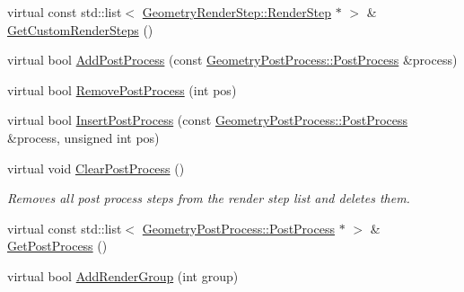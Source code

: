 \begin{DoxyCompactItemize}
virtual const std\+::list$<$ \mbox{\hyperlink{class_geometry_engine_1_1_geometry_render_step_1_1_render_step}{Geometry\+Render\+Step\+::\+Render\+Step}} $\ast$ $>$ \& \mbox{\hyperlink{class_geometry_engine_1_1_geometry_world_item_1_1_geometry_camera_1_1_camera_a55464c946d6e07ea8f00f5236593ee5f}{Get\+Custom\+Render\+Steps}} ()
\item 
virtual bool \mbox{\hyperlink{class_geometry_engine_1_1_geometry_world_item_1_1_geometry_camera_1_1_camera_aefeabe0fe7650e0b6236b59134058845}{Add\+Post\+Process}} (const \mbox{\hyperlink{class_geometry_engine_1_1_geometry_post_process_1_1_post_process}{Geometry\+Post\+Process\+::\+Post\+Process}} \&process)
\item 
virtual bool \mbox{\hyperlink{class_geometry_engine_1_1_geometry_world_item_1_1_geometry_camera_1_1_camera_ae66b1cfa82e67349786b3cf412f93e70}{Remove\+Post\+Process}} (int pos)
\item 
virtual bool \mbox{\hyperlink{class_geometry_engine_1_1_geometry_world_item_1_1_geometry_camera_1_1_camera_a6079f2bacb9134ca0c3d7e8a97993f8c}{Insert\+Post\+Process}} (const \mbox{\hyperlink{class_geometry_engine_1_1_geometry_post_process_1_1_post_process}{Geometry\+Post\+Process\+::\+Post\+Process}} \&process, unsigned int pos)
\item 
\mbox{\label{class_geometry_engine_1_1_geometry_world_item_1_1_geometry_camera_1_1_camera_a97e992ac9c5429aebca4797f5e545e46}} 
virtual void \mbox{\hyperlink{class_geometry_engine_1_1_geometry_world_item_1_1_geometry_camera_1_1_camera_a97e992ac9c5429aebca4797f5e545e46}{Clear\+Post\+Process}} ()
\begin{DoxyCompactList}\small\item\em Removes all post process steps from the render step list and deletes them. \end{DoxyCompactList}\item 
virtual const std\+::list$<$ \mbox{\hyperlink{class_geometry_engine_1_1_geometry_post_process_1_1_post_process}{Geometry\+Post\+Process\+::\+Post\+Process}} $\ast$ $>$ \& \mbox{\hyperlink{class_geometry_engine_1_1_geometry_world_item_1_1_geometry_camera_1_1_camera_a1ef9d25c964f8686f3da5594e0184d58}{Get\+Post\+Process}} ()
\item 
virtual bool \mbox{\hyperlink{class_geometry_engine_1_1_geometry_world_item_1_1_geometry_camera_1_1_camera_a0a76192f4a629a8b6f7a1900078869de}{Add\+Render\+Group}} (int group)
\item 

\end{DoxyCompactItemize}
